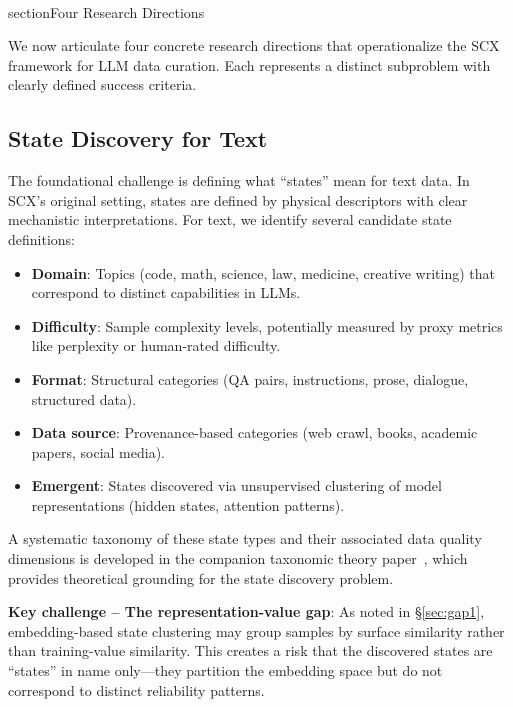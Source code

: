 \documentclass[11pt,twocolumn]{article}
\begin{document}
\\section{Four Research Directions}

We now articulate four concrete research directions that operationalize the SCX framework for LLM data curation. Each represents a distinct subproblem with clearly defined success criteria.

\subsection{State Discovery for Text}
\label{sec:state_discovery}

The foundational challenge is defining what ``states'' mean for text data. In SCX's original setting, states are defined by physical descriptors with clear mechanistic interpretations. For text, we identify several candidate state definitions:

\begin{itemize}
    \item \textbf{Domain}: Topics (code, math, science, law, medicine, creative writing) that correspond to distinct capabilities in LLMs.
    \item \textbf{Difficulty}: Sample complexity levels, potentially measured by proxy metrics like perplexity or human-rated difficulty.
    \item \textbf{Format}: Structural categories (QA pairs, instructions, prose, dialogue, structured data).
    \item \textbf{Data source}: Provenance-based categories (web crawl, books, academic papers, social media).
    \item \textbf{Emergent}: States discovered via unsupervised clustering of model representations (hidden states, attention patterns).
\end{itemize}

A systematic taxonomy of these state types and their associated data quality dimensions is developed in the companion taxonomic theory paper~\cite{scx2026taxonomy}, which provides theoretical grounding for the state discovery problem.

\textbf{Key challenge -- The representation-value gap}: As noted in \S\ref{sec:gap1}, embedding-based state clustering may group samples by surface similarity rather than training-value similarity. This creates a risk that the discovered states are ``states'' in name only---they partition the embedding space but do not correspond to distinct reliability patterns.
\end{document}
